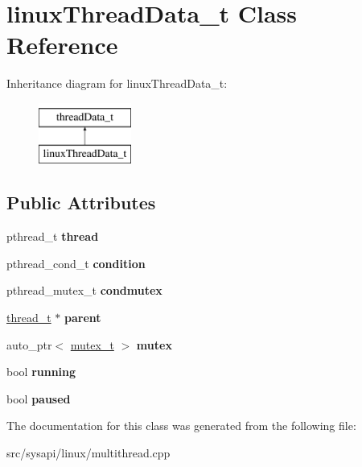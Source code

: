 \hypertarget{classlinuxThreadData__t}{\section{linux\-Thread\-Data\-\_\-t \-Class \-Reference}
\label{classlinuxThreadData__t}
}
\-Inheritance diagram for linux\-Thread\-Data\-\_\-t\-:\begin{figure}[H]
\begin{center}
\leavevmode
\includegraphics[height=2.000000cm]{classlinuxThreadData__t}
\end{center}
\end{figure}
\subsection*{\-Public \-Attributes}
\begin{DoxyCompactItemize}
\item 
\hypertarget{classlinuxThreadData__t_aafb024f4bf0d723b320c8ec0cda6dbf7}{pthread\-\_\-t {\bfseries thread}}\label{classlinuxThreadData__t_aafb024f4bf0d723b320c8ec0cda6dbf7}

\item 
\hypertarget{classlinuxThreadData__t_a0751d711638d127ffe3c62ac2b89bd30}{pthread\-\_\-cond\-\_\-t {\bfseries condition}}\label{classlinuxThreadData__t_a0751d711638d127ffe3c62ac2b89bd30}

\item 
\hypertarget{classlinuxThreadData__t_a207efeacc571bfff1921741b52442812}{pthread\-\_\-mutex\-\_\-t {\bfseries condmutex}}\label{classlinuxThreadData__t_a207efeacc571bfff1921741b52442812}

\item 
\hypertarget{classlinuxThreadData__t_ad85cf5c93ac9de36aabda8fa3c4a3e2d}{\hyperlink{classthread__t}{thread\-\_\-t} $\ast$ {\bfseries parent}}\label{classlinuxThreadData__t_ad85cf5c93ac9de36aabda8fa3c4a3e2d}

\item 
\hypertarget{classlinuxThreadData__t_a57ac99115fef3cab3a60d0b69353fdcd}{auto\-\_\-ptr$<$ \hyperlink{classmutex__t}{mutex\-\_\-t} $>$ {\bfseries mutex}}\label{classlinuxThreadData__t_a57ac99115fef3cab3a60d0b69353fdcd}

\item 
\hypertarget{classlinuxThreadData__t_a004e97ddc19fbbce680d1579b87f3993}{bool {\bfseries running}}\label{classlinuxThreadData__t_a004e97ddc19fbbce680d1579b87f3993}

\item 
\hypertarget{classlinuxThreadData__t_a78c40a9e2aa2bf64ac7c8dc17ed09766}{bool {\bfseries paused}}\label{classlinuxThreadData__t_a78c40a9e2aa2bf64ac7c8dc17ed09766}

\end{DoxyCompactItemize}


\-The documentation for this class was generated from the following file\-:\begin{DoxyCompactItemize}
\item 
src/sysapi/linux/multithread.\-cpp\end{DoxyCompactItemize}

